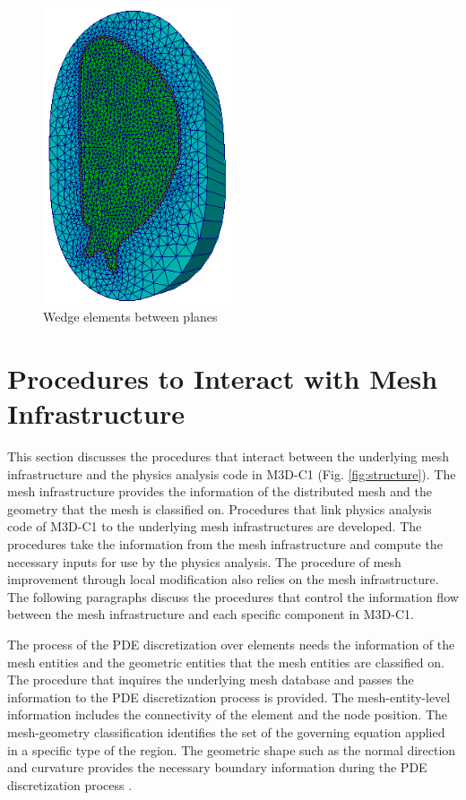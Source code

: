 \documentclass[11pt]{article}  %
\begin{document}
\begin{figure}[htb]
\center
\includegraphics[width=0.5\textwidth]{fig/3dmeshSlice.png}
\caption{Wedge elements between planes} \label{fig:3dmeshSlice}
\end{figure}
\afterpage{\clearpage}
\section{Procedures to Interact with  Mesh Infrastructure} \label{sec:parallel}
This section discusses the procedures that interact between the underlying mesh infrastructure and the physics analysis code in M3D-C1 (Fig. \ref{fig:structure}).  The mesh infrastructure provides the information of the distributed mesh and the geometry that the mesh is classified on. Procedures that link  physics analysis code of M3D-C1 to the underlying mesh infrastructures  are developed. The procedures take the information from the mesh infrastructure and  compute the necessary inputs for use by the physics analysis. The procedure of mesh improvement through local modification also relies on the mesh infrastructure. The following paragraphs discuss the procedures that control the information flow between the mesh infrastructure and each specific component in M3D-C1.

The process of the PDE discretization over elements needs the information of the mesh entities and the geometric entities that the mesh entities are classified on. The procedure that inquires  the underlying mesh database and passes the information to the PDE discretization process is provided.  The mesh-entity-level information includes the connectivity of the element and the node position. The mesh-geometry classification identifies the set of the governing equation applied in a specific type of the region. The geometric shape such as the normal direction and curvature provides the necessary boundary information during the  PDE discretization process \cite{jardin2010computational}.
\end{document}
